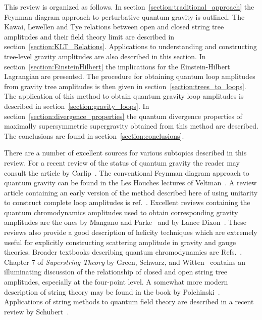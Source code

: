 \documentclass[12pt]{livrev}
\begin{document}
This review is organized as follows.  In
section~\ref{section:traditional_approach} the Feynman diagram
approach to perturbative quantum gravity is outlined.  The Kawai,
Lewellen and Tye relations between open and closed string tree
amplitudes and their field theory limit are described in
section~\ref{section:KLT_Relations}.  Applications to understanding
and constructing tree-level gravity amplitudes are also described in
this section.  In section~\ref{section:EinsteinHilbert} the
implications for the Einstein-Hilbert Lagrangian are presented. The
procedure for obtaining quantum loop amplitudes from gravity tree
amplitudes is then given in section~\ref{section:trees_to_loops}.  The
application of this method to obtain quantum gravity loop amplitudes
is described in section~\ref{section:gravity_loops}. In
section~\ref{section:divergence_properties} the quantum divergence
properties of maximally supersymmetric supergravity obtained from this
method are described.  The conclusions are found in
section~\ref{section:conclusions}.

There are a number of excellent sources for various subtopics
described in this review.  For a recent review of the status of
quantum gravity the reader may consult the article by
Carlip~\cite{Carlip}. The conventional Feynman diagram approach to
quantum gravity can be found in the Les Houches lectures of
Veltman~\cite{VeltmanGravity}.  A review article containing an early
version of the method described here of using unitarity to construct
complete loop amplitudes is ref.~\cite{Review}.  Excellent reviews
containing the quantum chromodynamics amplitudes used to obtain
corresponding gravity amplitudes are the ones by Mangano and
Parke~\cite{ManganoReview} and by Lance Dixon~\cite{TasiLance}.  These
reviews also provide a good description of helicity techniques which
are extremely useful for explicitly constructing scattering amplitude
in gravity and gauge theories.  Broader textbooks describing quantum
chromodynamics are Refs.~\cite{Peskin95,Weinberg95,Ellis96}.  Chapter
7 of {\it Superstring Theory} by Green, Schwarz, and Witten~\cite{GSW}
contains an illuminating discussion of the relationship of closed and
open string tree amplitudes, especially at the four-point level.  A
somewhat more modern description of string theory may be found in the
book by Polchinski~\cite{Polchinski98A,Polchinski98B}.  Applications
of string methods to quantum field theory are described in a 
recent review by Schubert~\cite{Schubert01}.


\newpage
\end{document}
